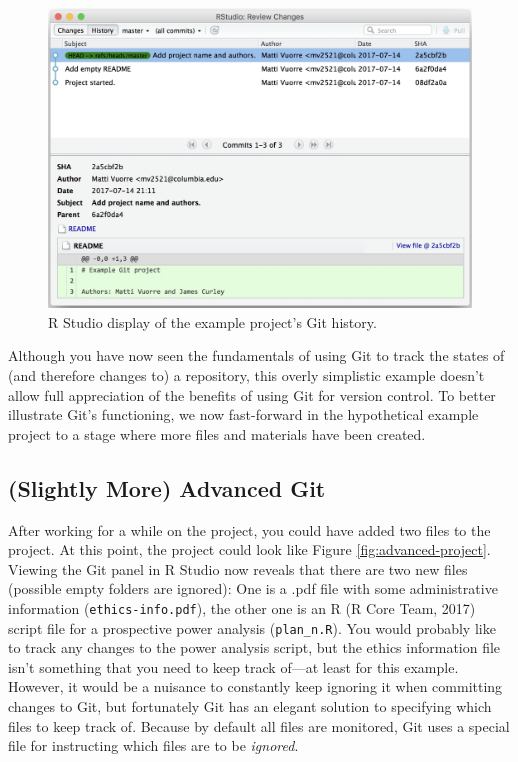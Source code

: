 \documentclass[
  american,
  ,doc,floatsintext]{apa6}
\begin{document}
\begin{figure}

{\centering \includegraphics[width=4.97in]{images/rstudio-git-4} 

}

\caption{R Studio display of the example project's Git history.}\label{fig:rstudio-git-4}
\end{figure}

Although you have now seen the fundamentals of using Git to track the states of (and therefore changes to) a repository, this overly simplistic example doesn't allow full appreciation of the benefits of using Git for version control. To better illustrate Git's functioning, we now fast-forward in the hypothetical example project to a stage where more files and materials have been created.

\hypertarget{slightly-more-advanced-git}{%
\subsection{(Slightly More) Advanced Git}\label{slightly-more-advanced-git}}

After working for a while on the project, you could have added two files to the project. At this point, the project could look like Figure \ref{fig:advanced-project}. Viewing the Git panel in R Studio now reveals that there are two new files (possible empty folders are ignored): One is a .pdf file with some administrative information (\texttt{ethics-info.pdf}), the other one is an R (R Core Team, 2017) script file for a prospective power analysis (\texttt{plan\_n.R}). You would probably like to track any changes to the power analysis script, but the ethics information file isn't something that you need to keep track of---at least for this example. However, it would be a nuisance to constantly keep ignoring it when committing changes to Git, but fortunately Git has an elegant solution to specifying which files to keep track of. Because by default all files are monitored, Git uses a special file for instructing which files are to be \emph{ignored}.
\end{document}

